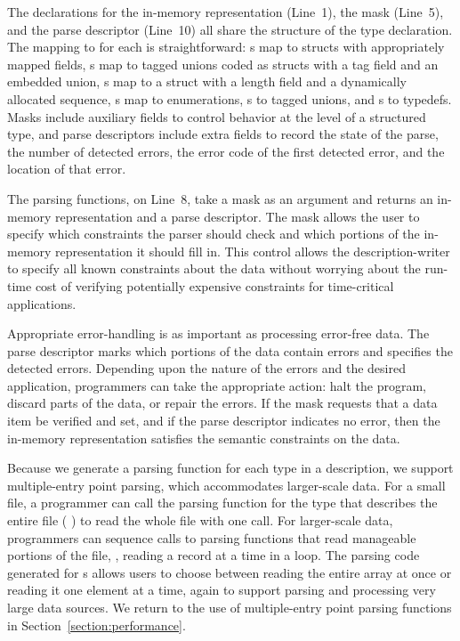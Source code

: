 The \C{} declarations for the in-memory representation (Line~1), the
mask (Line~5), 
and the parse descriptor (Line~10) all share the structure of the \pads{}
type declaration.  The mapping to \C{} for each is straightforward: 
s map to \C{} structs with appropriately mapped fields, 
s map to tagged unions coded as \C{} structs with a tag field 
and an embedded 
union, s map to a \C{} struct with a length field and a 
dynamically allocated sequence, s map to \C{} enumerations, s 
to tagged unions, and s to \C{} typedefs.  Masks include
auxiliary fields to control behavior at the level of a structured
type, and parse descriptors include extra fields to record the 
state of the parse, the number of detected errors, 
the error code of the first detected error, and the location of that error.

The parsing functions, \eg{}  on Line~8, take a mask as an argument and returns an
in-memory representation and a parse descriptor.  
The mask allows the user to specify 
which constraints the parser should check and which portions of the
in-memory representation it should fill in.  This control allows the
description-writer to specify all known constraints about the data
without worrying about the run-time cost of verifying potentially
expensive constraints for time-critical applications.

Appropriate error-handling is as important as processing error-free
data.  The parse descriptor marks which portions of the data contain
errors and specifies the detected errors.  Depending upon the nature
of the errors and the desired application, programmers can take the
appropriate action: halt the program, discard parts of the data, or
repair the errors.  If the mask requests that a data item be verified
and set, and if the parse descriptor indicates no error, then the
in-memory representation satisfies the semantic constraints on the
data.

Because we generate a parsing function for each type in a \pads{}
description, we support multiple-entry point parsing, which
accommodates larger-scale data.  For a small file, a programmer can
call the parsing function for the \pads{} type that describes the
entire file ( \eg{} ) to read the whole file with
one call.  For larger-scale data, programmers can sequence calls to
parsing functions that read manageable portions of the file, \eg{},
reading a record at a time in a loop.  The parsing code generated for
s allows users to choose between reading the entire array
at once or reading it one element at a time, again to support parsing
and processing very large data sources.  We return to the use of
multiple-entry point parsing functions in
Section~\ref{section:performance}.


